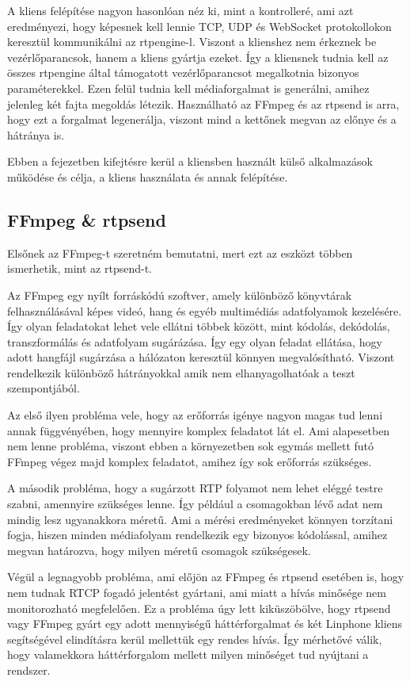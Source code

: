 A kliens felépítése nagyon hasonlóan néz ki, mint a kontrolleré, ami azt 
eredményezi, hogy képesnek kell lennie  TCP, UDP és WebSocket protokollokon
keresztül kommunikálni az rtpengine-l. Viszont a klienshez nem érkeznek be 
vezérlőparancsok, hanem a kliens gyártja ezeket. Így a kliensnek tudnia kell
az összes rtpengine által támogatott vezérlőparancsot megalkotnia bizonyos 
paraméterekkel. Ezen felül tudnia kell médiaforgalmat is generálni, amihez
jelenleg két fajta megoldás létezik. Használható az FFmpeg és az rtpsend 
is arra, hogy ezt a forgalmat legenerálja, viszont mind a kettőnek megvan
az előnye és a hátránya is. 

Ebben a fejezetben kifejtésre kerül a kliensben használt külső alkalmazások
működése és célja, a kliens használata és annak felépítése. 

\subsection{FFmpeg \& rtpsend}

Elsőnek az FFmpeg-t szeretném bemutatni, mert ezt az eszközt többen ismerhetik,
mint az rtpsend-t. 

Az FFmpeg \cite{ffmpeg} egy nyílt forráskódú szoftver, amely különböző könyvtárak felhasználásával
képes videó, hang és egyéb multimédiás adatfolyamok kezelésére. Így olyan feladatokat
lehet vele ellátni többek között, mint kódolás, dekódolás, transzformálás és 
adatfolyam sugárázása. Így egy olyan feladat ellátása, hogy adott hangfájl sugárzása a 
hálózaton keresztül könnyen megvalósítható. Viszont rendelkezik különböző hátrányokkal
amik nem elhanyagolhatóak a teszt szempontjából.

Az első ilyen probléma vele, hogy az erőforrás igénye nagyon magas tud lenni 
annak függvényében, hogy mennyire komplex feladatot lát el. Ami alapesetben nem lenne
probléma, viszont ebben a környezetben sok egymás mellett futó FFmpeg végez majd
komplex feladatot, amihez így sok erőforrás szükséges.

A második probléma, hogy a sugárzott RTP folyamot nem lehet eléggé testre szabni, 
amennyire szükséges lenne. Így például a csomagokban lévő adat nem mindig lesz 
ugyanakkora méretű. Ami a mérési eredményeket könnyen torzítani fogja, hiszen 
minden médiafolyam rendelkezik egy bizonyos kódolással, amihez megvan határozva, hogy
milyen méretű csomagok szükségesek.

Végül a legnagyobb probléma, ami előjön az FFmpeg és rtpsend esetében is, hogy nem
tudnak RTCP fogadó jelentést gyártani, ami miatt a hívás minősége nem monitorozható 
megfelelően. Ez a probléma úgy lett kiküszöbölve, hogy rtpsend vagy FFmpeg gyárt
egy adott mennyiségű háttérforgalmat és két Linphone kliens segítségével elindításra 
kerül mellettük egy rendes hívás. Így mérhetővé válik, hogy valamekkora háttérforgalom
mellett milyen minőséget tud nyújtani a rendszer. \\

